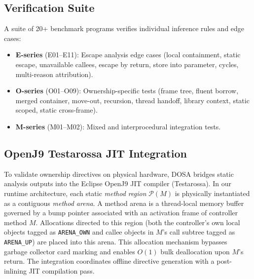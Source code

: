 \documentclass[12pt,a4paper]{article}
\begin{document}
\subsection{Verification Suite}

A suite of 20+ benchmark programs verifies individual inference rules and edge cases:
\begin{itemize}
  \item \textbf{E-series} (E01--E11): Escape analysis edge cases (local containment, static escape, unavailable callees, escape by return, store into parameter, cycles, multi-reason attribution).
  \item \textbf{O-series} (O01--O09): Ownership-specific tests (frame tree, fluent borrow, merged container, move-out, recursion, thread handoff, library context, static scoped, static cross-frame).
  \item \textbf{M-series} (M01--M02): Mixed and interprocedural integration tests.
\end{itemize}


\subsection{OpenJ9 Testarossa JIT Integration}

To validate ownership directives on physical hardware, DOSA bridges static analysis outputs into the Eclipse OpenJ9 JIT compiler (Testarossa). In our runtime architecture, each static \emph{method region} $\mathcal{P}(M)$ is physically instantiated as a contiguous \emph{method arena}. A method arena is a thread-local memory buffer governed by a bump pointer associated with an activation frame of controller method $M$. Allocations directed to this region (both the controller's own local objects tagged as \texttt{ARENA\_OWN} and callee objects in $M$'s call subtree tagged as \texttt{ARENA\_UP}) are placed into this arena. This allocation mechanism bypasses garbage collector card marking and enables $O(1)$ bulk deallocation upon $M$'s return. The integration coordinates offline directive generation with a post-inlining JIT compilation pass.
\end{document}
